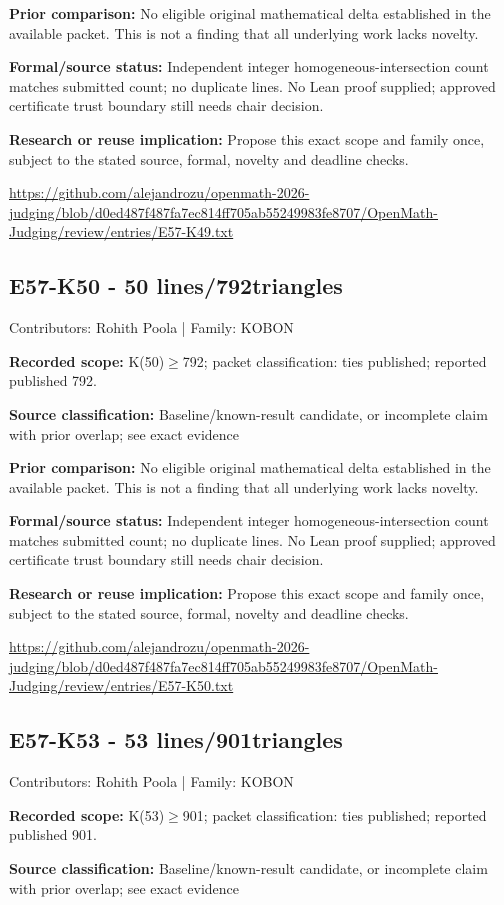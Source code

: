 \documentclass[11pt,a4paper]{article}
\begin{document}
\textbf{Prior comparison:} No eligible original mathematical delta established in the available packet. This is not a finding that all underlying work lacks novelty.

\textbf{Formal/source status:} Independent integer homogeneous-intersection count matches submitted count; no duplicate lines. No Lean proof supplied; approved certificate trust boundary still needs chair decision.

\textbf{Research or reuse implication:} Propose this exact scope and family once, subject to the stated source, formal, novelty and deadline checks.

{\small \url{https://github.com/alejandrozu/openmath-2026-judging/blob/d0ed487f487fa7ec814ff705ab55249983fe8707/OpenMath-Judging/review/entries/E57-K49.txt}\par}

\begin{samepage}
\subsection{E57-K50  -  50 lines/792triangles}
{\small Contributors: Rohith Poola | Family: KOBON\par}

\textbf{Recorded scope:} K(50)\ensuremath{\geq}792; packet classification: ties published; reported published 792.

\end{samepage}
\textbf{Source classification:} Baseline/known-result candidate, or incomplete claim with prior overlap; see exact evidence

\textbf{Prior comparison:} No eligible original mathematical delta established in the available packet. This is not a finding that all underlying work lacks novelty.

\textbf{Formal/source status:} Independent integer homogeneous-intersection count matches submitted count; no duplicate lines. No Lean proof supplied; approved certificate trust boundary still needs chair decision.

\textbf{Research or reuse implication:} Propose this exact scope and family once, subject to the stated source, formal, novelty and deadline checks.

{\small \url{https://github.com/alejandrozu/openmath-2026-judging/blob/d0ed487f487fa7ec814ff705ab55249983fe8707/OpenMath-Judging/review/entries/E57-K50.txt}\par}

\begin{samepage}
\subsection{E57-K53  -  53 lines/901triangles}
{\small Contributors: Rohith Poola | Family: KOBON\par}

\textbf{Recorded scope:} K(53)\ensuremath{\geq}901; packet classification: ties published; reported published 901.

\end{samepage}
\textbf{Source classification:} Baseline/known-result candidate, or incomplete claim with prior overlap; see exact evidence
\end{document}
